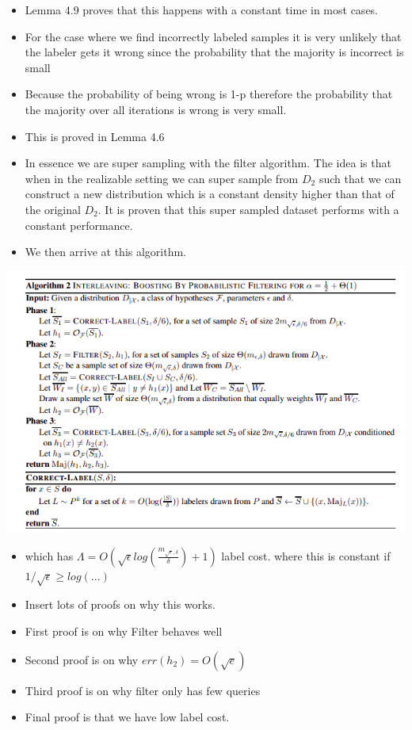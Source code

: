 \documentclass[11pt]{article}
\begin{document}
\begin{itemize}
\item Lemma 4.9 proves that this happens with a constant time in most cases.
\item For the case where we find incorrectly labeled samples it is very unlikely that the labeler gets it wrong since the probability that the majority is incorrect is small
\item Because the probability of being wrong is 1-p therefore the probability that the majority over all iterations is wrong is very small.
\item This is proved in Lemma 4.6
\item In essence we are super sampling with the filter algorithm. The idea is that when in the realizable setting we can super sample from \(D_2\) such that we can construct a new distribution which is a constant density higher than that of the original \(D_2\). It is proven that this super sampled dataset performs with a constant performance.
\item We then arrive at this algorithm.
\end{itemize}
\begin{center}
\includegraphics[width=.9\linewidth]{./images/Algo2.png}
\end{center}
\begin{itemize}
\item which has \(\Lambda = O(\sqrt{\epsilon}log(\frac{m_{\sqrt{\epsilon},\delta}}{\delta})+1)\) label cost. where this is constant if \(1/\sqrt{\epsilon} \geq log(...)\)
\item Insert lots of proofs on why this works.
\item First proof is on why Filter behaves well
\item Second proof is on why \(err(h_2) = O(\sqrt{e})\)
\item Third proof is on why filter only has few queries
\item Final proof is that we have low label cost.
\end{itemize}
\end{document}
